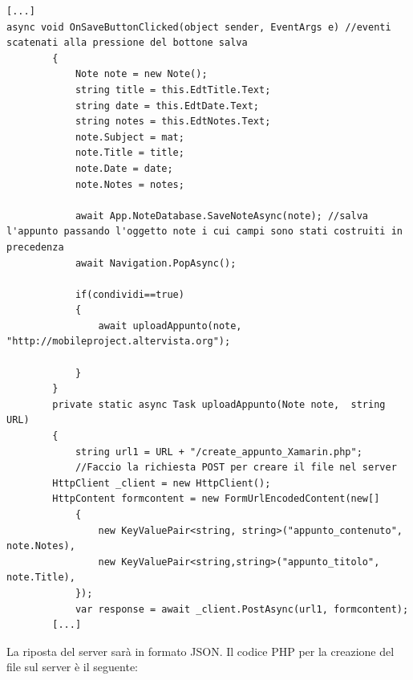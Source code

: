 \documentclass[a4paper, 50pt, twoside]{article}
\begin{document}
\begin{lstlisting}
[...]
async void OnSaveButtonClicked(object sender, EventArgs e) //eventi scatenati alla pressione del bottone salva
        {
            Note note = new Note();
            string title = this.EdtTitle.Text;
            string date = this.EdtDate.Text;
            string notes = this.EdtNotes.Text;
            note.Subject = mat;
            note.Title = title;
            note.Date = date;
            note.Notes = notes;

            await App.NoteDatabase.SaveNoteAsync(note); //salva l'appunto passando l'oggetto note i cui campi sono stati costruiti in precedenza
            await Navigation.PopAsync();

            if(condividi==true)
            {
                await uploadAppunto(note, "http://mobileproject.altervista.org");
                   
            }
        }
        private static async Task uploadAppunto(Note note,  string URL)
        {
            string url1 = URL + "/create_appunto_Xamarin.php";
            //Faccio la richiesta POST per creare il file nel server
        HttpClient _client = new HttpClient();
        HttpContent formcontent = new FormUrlEncodedContent(new[]
            {
                new KeyValuePair<string, string>("appunto_contenuto", note.Notes),
                new KeyValuePair<string,string>("appunto_titolo", note.Title),
            });
            var response = await _client.PostAsync(url1, formcontent);
	    [...]
\end{lstlisting}
La riposta del server sarà in formato JSON. Il codice PHP per la creazione del file sul server è il seguente:
\end{document}

